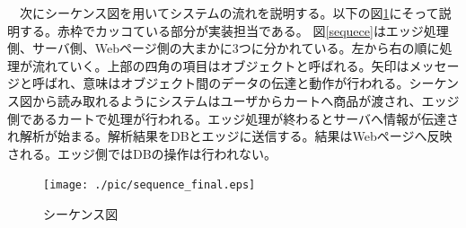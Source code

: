 　次にシーケンス図を用いてシステムの流れを説明する。以下の図\ref{sequence}にそって説明する。赤枠でカッコている部分が実装担当である。
図\ref{sequece}はエッジ処理側、サーバ側、Webページ側の大まかに3つに分かれている。左から右の順に処理が流れていく。上部の四角の項目はオブジェクトと呼ばれる。矢印はメッセージと呼ばれ、意味はオブジェクト間のデータの伝達と動作が行われる。シーケンス図から読み取れるようにシステムはユーザからカートへ商品が渡され、エッジ側であるカートで処理が行われる。エッジ処理が終わるとサーバへ情報が伝達され解析が始まる。解析結果をDBとエッジに送信する。結果はWebページへ反映される。エッジ側ではDBの操作は行われない。


\begin{figure}[htbp]
\centering
\texttt{[image: ./pic/sequence\_final.eps]}
\caption{シーケンス図}
\label{sequence}
\end{figure}



